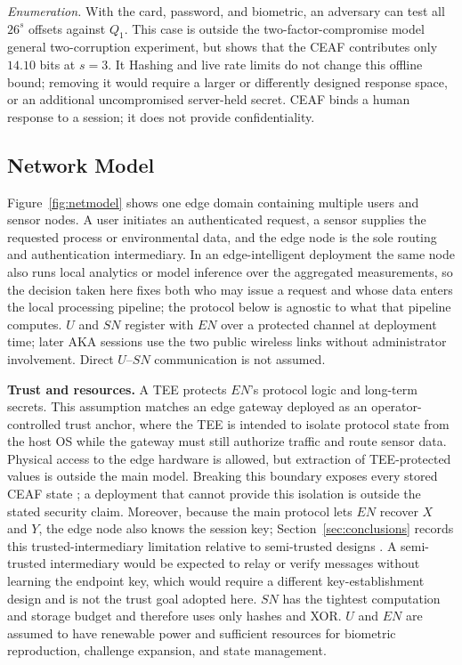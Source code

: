 \documentclass[cmc,article,submit,moreauthors,pdftex]{Definitions/tsp}
\providecommand{\DIFadd}[1]{{\protect\color{blue} \sf #1}} %
\providecommand{\DIFdel}[1]{{\protect\color{red} \scriptsize #1}} %
\providecommand{\DIFaddbegin}{} %
\providecommand{\DIFaddend}{} %
\providecommand{\DIFdelbegin}{} %
\providecommand{\DIFdelend}{} %
\begin{document}
\emph{Enumeration.} With the card, password, and biometric, an adversary can test all $26^s$ offsets against $Q_1$. This case is outside the \DIFdelbegin \DIFdel{two-factor-compromise model}\DIFdelend \DIFaddbegin \DIFadd{general two-corruption experiment}\DIFaddend , but shows that the CEAF contributes only $14.10$ bits at $s=3$. \DIFdelbegin \DIFdel{It }\DIFdelend \DIFaddbegin \DIFadd{Hashing and live rate limits do not change this offline bound; removing it would require a larger or differently designed response space, or an additional uncompromised server-held secret. CEAF }\DIFaddend binds a human response to a session; it does not provide confidentiality.

\subsection{Network Model}\label{sec:netmodel}

Figure~\ref{fig:netmodel} shows one edge domain containing multiple users and sensor nodes. A user initiates an authenticated request, a sensor supplies the requested process or environmental data, and the edge node is the sole routing and authentication intermediary. In an edge-intelligent deployment the same node also runs local analytics or model inference over the aggregated measurements, so the decision taken here fixes both who may issue a request and whose data enters the local processing pipeline; the protocol below is agnostic to what that pipeline computes. $U$ and $SN$ register with $EN$ over a protected channel at deployment time; later AKA sessions use the two public wireless links without administrator involvement. Direct $U$--$SN$ communication is not assumed.

\textbf{Trust and resources.} A TEE protects $EN$'s protocol logic and long-term secrets. \DIFaddbegin \DIFadd{This assumption matches an edge gateway deployed as an operator-controlled trust anchor, where the TEE is intended to isolate protocol state from the host OS while the gateway must still authorize traffic and route sensor data. }\DIFaddend Physical access to the edge hardware is allowed, but extraction of TEE-protected values is outside the main model. Breaking this boundary exposes every stored CEAF state\DIFaddbegin \DIFadd{; a deployment that cannot provide this isolation is outside the stated security claim}\DIFaddend . Moreover, because the main protocol lets $EN$ recover $X$ and $Y$, the edge node also knows the session key; Section~\ref{sec:conclusions} records this trusted-intermediary limitation relative to semi-trusted designs \cite{cui}. \DIFaddbegin \DIFadd{A semi-trusted intermediary would be expected to relay or verify messages without learning the endpoint key, which would require a different key-establishment design and is not the trust goal adopted here. }\DIFaddend $SN$ has the tightest computation and storage budget and therefore uses only hashes and XOR. $U$ and $EN$ are assumed to have renewable power and sufficient resources for biometric reproduction, challenge expansion, and state management.
\end{document}
